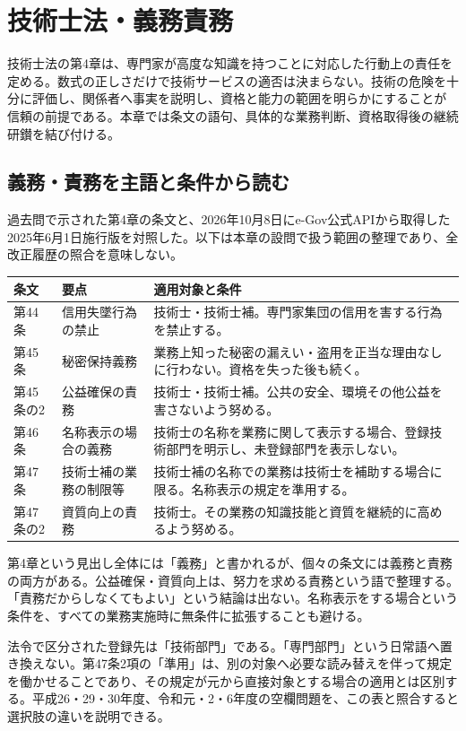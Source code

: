 \chapter{技術士法・義務責務}
技術士法の第4章は、専門家が高度な知識を持つことに対応した行動上の責任を定める。数式の正しさだけで技術サービスの適否は決まらない。技術の危険を十分に評価し、関係者へ事実を説明し、資格と能力の範囲を明らかにすることが信頼の前提である。本章では条文の語句、具体的な業務判断、資格取得後の継続研鑚を結び付ける。

\section{義務・責務を主語と条件から読む}
\label{theory:engineer_act:duties}
過去問で示された第4章の条文と、2026年10月8日にe-Gov公式APIから取得した2025年6月1日施行版を対照した。以下は本章の設問で扱う範囲の整理であり、全改正履歴の照合を意味しない\cite{engineer_act_current}。
\begin{longtable}{p{.13\linewidth}p{.29\linewidth}p{.47\linewidth}}
条文 & 要点 & 適用対象と条件\\\hline
第44条 & 信用失墜行為の禁止 & 技術士・技術士補。専門家集団の信用を害する行為を禁止する。\\
第45条 & 秘密保持義務 & 業務上知った秘密の漏えい・盗用を正当な理由なしに行わない。資格を失った後も続く。\\
第45条の2 & 公益確保の責務 & 技術士・技術士補。公共の安全、環境その他公益を害さないよう努める。\\
第46条 & 名称表示の場合の義務 & 技術士の名称を業務に関して表示する場合、登録技術部門を明示し、未登録部門を表示しない。\\
第47条 & 技術士補の業務の制限等 & 技術士補の名称での業務は技術士を補助する場合に限る。名称表示の規定を準用する。\\
第47条の2 & 資質向上の責務 & 技術士。その業務の知識技能と資質を継続的に高めるよう努める。\\
\end{longtable}
第4章という見出し全体には「義務」と書かれるが、個々の条文には義務と責務の両方がある。公益確保・資質向上は、努力を求める責務という語で整理する。「責務だからしなくてもよい」という結論は出ない。名称表示をする場合という条件を、すべての業務実施時に無条件に拡張することも避ける。

法令で区分された登録先は「技術部門」である。「専門部門」という日常語へ置き換えない。第47条2項の「準用」は、別の対象へ必要な読み替えを伴って規定を働かせることであり、その規定が元から直接対象とする場合の適用とは区別する。平成26・29・30年度、令和元・2・6年度の空欄問題を、この表と照合すると選択肢の違いを説明できる。


